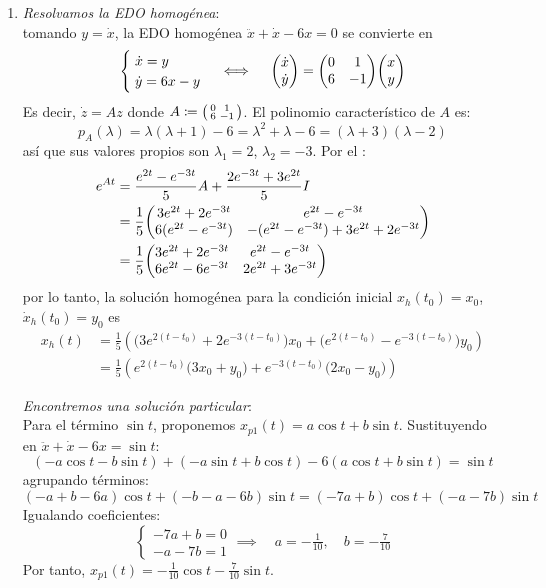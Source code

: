 \begin{sol}
\begin{enumerate}[leftmargin=*, label=(\alph*)]
\item \emph{Resolvamos la EDO homogénea}:\\
tomando $y = \dot{x}$, la EDO homogénea $\ddot{x} + \dot{x} - 6x = 0$ se convierte en 
\[
\begin{cases}
\;\dot{x} = y\\
\;\dot{y} = 6x - y
\end{cases}%
\iff\quad%
\mqty(\dot{x}\\\dot{y}) = \mqty(0&1\\6&-1)\mqty(x\\y)
\]
Es decir, $\dot{z} = Az$ donde $A \coloneq \smqty(0&1\\6&-1)$. El polinomio característico de $A$ es:
\[
p_A(\lambda) = \lambda(\lambda+1) - 6 = \lambda^2 + \lambda - 6 = (\lambda+3)(\lambda-2)
\]
así que sus valores propios son $\lambda_1 = 2$, $\lambda_2 = -3$. Por el :
\begin{align*}
e^{At} &= \frac{e^{2t} - e^{-3t}}{5}A + \frac{2e^{-3t} + 3e^{2t}}{5}I \\
&= \frac15\mqty(3e^{2t} + 2e^{-3t} & e^{2t} - e^{-3t} \\ 6(e^{2t} - e^{-3t}) & -(e^{2t} - e^{-3t}) + 3e^{2t} + 2e^{-3t}) \\
&= \frac15\mqty(3e^{2t} + 2e^{-3t} & e^{2t} - e^{-3t} \\ 6e^{2t} - 6e^{-3t} & 2e^{2t} + 3e^{-3t})
\end{align*}
por lo tanto, la solución homogénea para la condición inicial $x_h(t_0) = x_0$, $\dot{x}_h(t_0) = y_0$ es
\begin{align*}
x_h(t)%
&= \frac15\left(\big(3e^{2(t-t_0)} + 2e^{-3(t-t_0)}\big)x_0 + \big(e^{2(t-t_0)} - e^{-3(t-t_0)}\big)y_0\right)\\
&= \frac15\left(e^{2(t-t_0)}\big(3x_0 + y_0\big) + e^{-3(t-t_0)}\big(2x_0 - y_0\big)\right)
\end{align*}

\emph{Encontremos una solución particular}:\\
Para el término $\sin t$, proponemos $x_{p1}(t) = a\cos t + b\sin t$. Sustituyendo en $\ddot{x} + \dot{x} - 6x = \sin t$:
\[
(-a\cos t - b\sin t) + (-a\sin t + b\cos t) - 6(a\cos t + b\sin t) = \sin t
\]
agrupando términos:
\[
(-a + b - 6a)\cos t + (-b - a - 6b)\sin t = (-7a + b)\cos t + (-a - 7b)\sin t
\]
Igualando coeficientes:
\[
\begin{cases}
-7a + b = 0 \\
-a - 7b = 1
\end{cases}
\implies\quad 
a = -\tfrac{1}{10},\quad b = -\tfrac{7}{10}
\]
Por tanto, $x_{p1}(t) = -\tfrac{1}{10}\cos t - \tfrac{7}{10}\sin t$.


\end{enumerate}
\end{sol}
